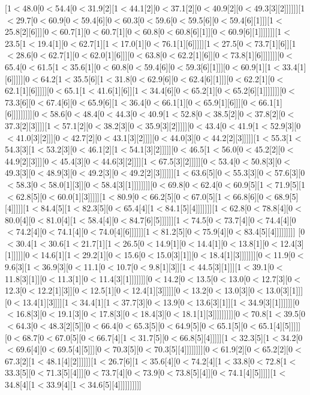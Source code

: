 [1$<$48.0[0$<$54.4[0$<$31.9[2][1$<$44.1[2][0$<$37.1[2][0$<$40.9[2][0$<$49.3[3][2]]]]]][1$<$29.7[0$<$60.9[0$<$59.4[6][0$<$60.3[0$<$59.6[0$<$59.5[6][0$<$59.4[6][1]]][1$<$25.8[2][6]]][0$<$60.7[1][0$<$60.7[1][0$<$60.8[0$<$60.8[6][1]][0$<$60.9[6][1]]]]]]][1$<$23.5[1$<$19.4[1][0$<$62.7[1][1$<$17.0[1][0$<$76.1[1][6]]]]][1$<$27.5[0$<$73.7[1][6]][1$<$28.6[0$<$62.7[1][0$<$62.0[1][6]]][0$<$63.8[0$<$62.2[1][6]][0$<$73.8[1][6]]]]]]][0$<$65.4[0$<$61.5[1$<$35.6[1][0$<$60.8[0$<$59.4[6][0$<$59.3[6][1]]][0$<$60.9[1][1$<$33.4[1][6]]]]][0$<$64.2[1$<$35.5[6][1$<$31.8[0$<$62.9[6][0$<$62.4[6][1]]][0$<$62.2[1][0$<$62.1[1][6]]]]][0$<$65.1[1$<$41.6[1][6]][1$<$34.4[6][0$<$65.2[1][0$<$65.2[6][1]]]]]]][0$<$73.3[6][0$<$67.4[6][0$<$65.9[6][1$<$36.4[0$<$66.1[1][0$<$65.9[1][6]]][0$<$66.1[1][6]]]]]]]]][0$<$58.6[0$<$48.4[0$<$44.3[0$<$40.9[1$<$52.8[0$<$38.5[2][0$<$37.8[2][0$<$37.3[2][3]]]][1$<$57.1[2][0$<$38.2[3][0$<$35.9[3][2]]]]][0$<$43.4[0$<$41.9[1$<$52.9[3][0$<$41.0[3][2]]][0$<$42.7[2][0$<$43.1[3][2]]]][0$<$44.0[3][0$<$44.2[2][3]]]]][1$<$55.3[1$<$54.3[3][1$<$53.2[3][0$<$46.1[2][1$<$54.1[3][2]]]]][0$<$46.5[1$<$56.0[0$<$45.2[2][0$<$44.9[2][3]]][0$<$45.4[3][0$<$44.6[3][2]]]][1$<$67.5[3][2]]]]][0$<$53.4[0$<$50.8[3][0$<$49.3[3][0$<$48.9[3][0$<$49.2[3][0$<$49.2[2][3]]]]]][1$<$63.6[5][0$<$55.3[3][0$<$57.6[3][0$<$58.3[0$<$58.0[1][3]][0$<$58.4[3][1]]]]]]]][0$<$69.8[0$<$62.4[0$<$60.9[5][1$<$71.9[5][1$<$62.8[5][0$<$60.0[1][3]]]]][1$<$80.9[0$<$66.2[5][0$<$67.0[5][1$<$66.8[6][0$<$68.9[5][4]]]]][1$<$84.4[5][1$<$82.3[5][0$<$65.4[4][1$<$84.1[5][4]]]]]]][1$<$62.8[0$<$78.8[4][0$<$80.0[4][0$<$81.0[4][1$<$58.4[4][0$<$84.7[6][5]]]]]][1$<$74.5[0$<$73.7[4][0$<$74.4[4][0$<$74.2[4][0$<$74.1[4][0$<$74.0[4][6]]]]]][1$<$81.2[5][0$<$75.9[4][0$<$83.4[5][4]]]]]]]]]
[0$<$30.4[1$<$30.6[1$<$21.7[1][1$<$26.5[0$<$14.9[1][0$<$14.4[1][0$<$13.8[1][0$<$12.4[3][1]]]]][0$<$14.6[1][1$<$29.2[1][0$<$15.6[0$<$15.0[3][1]][0$<$18.4[1][3]]]]]]][0$<$11.9[0$<$9.6[3][1$<$36.9[3][0$<$11.1[0$<$10.7[0$<$9.8[1][3]][1$<$44.5[3][1]]][1$<$39.1[0$<$11.8[3][1]][0$<$11.3[1][0$<$11.4[3][1]]]]]]][0$<$14.2[0$<$13.5[0$<$13.0[0$<$12.7[3][0$<$12.3[0$<$12.2[1][3]][0$<$12.5[1][0$<$12.4[1][3]]]]][0$<$13.2[0$<$13.0[3][0$<$13.0[3][1]]][0$<$13.4[1][3]]]][1$<$34.4[1][1$<$37.7[3][0$<$13.9[0$<$13.6[3][1]][1$<$34.9[3][1]]]]]][0$<$16.8[3][0$<$19.1[3][0$<$17.8[3][0$<$18.4[3][0$<$18.1[1][3]]]]]]]]][0$<$70.8[1$<$39.5[0$<$64.3[0$<$48.3[2][5]][0$<$66.4[0$<$65.3[5][0$<$64.9[5][0$<$65.1[5][0$<$65.1[4][5]]]]][0$<$68.7[0$<$67.0[5][0$<$66.7[4][1$<$31.7[5][0$<$66.8[5][4]]]]][1$<$32.3[5][1$<$34.2[0$<$69.6[4][0$<$69.5[4][5]]][0$<$70.3[5][0$<$70.3[5][4]]]]]]]][0$<$61.9[2][0$<$65.2[2][0$<$67.3[2][1$<$48.1[4][2]]]]]][1$<$26.7[6][1$<$35.6[4][0$<$74.2[4][1$<$33.8[0$<$72.8[1$<$33.3[5][0$<$71.3[5][4]]][0$<$73.7[4][0$<$73.9[0$<$73.8[5][4]][0$<$74.1[4][5]]]]][1$<$34.8[4][1$<$33.9[4][1$<$34.6[5][4]]]]]]]]]]
